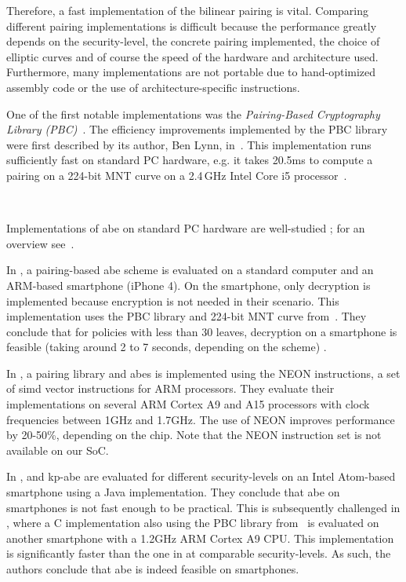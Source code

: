 Therefore, a fast implementation of the bilinear pairing is vital.
Comparing different pairing implementations is difficult because the performance greatly depends on the \gls{security-level}, the concrete pairing implemented, the choice of elliptic curves and of course the speed of the hardware and architecture used. 
Furthermore, many implementations are not portable due to hand-optimized assembly code or the use of architecture-specific instructions.

One of the first notable implementations was the \emph{Pairing-Based Cryptography Library (PBC)}~\cite{lynn_pairing-based_nodate, lynn_implementation_2007}.
The efficiency improvements implemented by the PBC library were first described by its author, Ben Lynn, in~\cite{lynn_implementation_2007}.
This implementation runs sufficiently fast on standard PC hardware, e.g. it takes 20.5ms to compute a pairing on a 224-bit MNT curve on a 2.4\,GHz Intel Core i5 processor~\cite{akinyele_self-protecting_2010}.

~

Implementations of \acrshort{abe} on standard PC hardware are well-studied \cite{bethencourt_ciphertext-policy_2007,akinyele_charm_2013,green_functional_nodate}; for an overview see~\cite{zickau_applied_2016}.

In \cite{akinyele_self-protecting_2010}, a pairing-based \acrshort{abe} scheme is evaluated on a standard computer and an ARM-based smartphone (iPhone 4).
On the smartphone, only decryption is implemented because encryption is not needed in their scenario.
This implementation uses the PBC library and 224-bit MNT curve from~\cite{lynn_implementation_2007}.
They conclude that for policies with less than 30 leaves, decryption on a smartphone is feasible (taking around 2 to 7 seconds, depending on the scheme) \cite{akinyele_self-protecting_2010}.

In \cite{sanchez_neon_2013}, a pairing library and \acrshort{abes} is implemented using the NEON instructions, a set of \acrshort{simd} vector instructions for ARM processors.
They evaluate their implementations on several ARM Cortex A9 and A15 processors with clock frequencies between 1GHz and 1.7GHz.
The use of NEON improves performance by 20-50\%, depending on the chip.
Note that the NEON instruction set is not available on our SoC. 

In \cite{wang_performance_2014},  and \acrshort{kp-abe} are evaluated for different \glspl{security-level} on an Intel Atom-based smartphone using a Java implementation.
They conclude that \acrshort{abe} on smartphones is not fast enough to be practical.
This is subsequently challenged in \cite{ambrosin_feasibility_2015}, where a C implementation also using the PBC library from~\cite{lynn_implementation_2007} is evaluated on another smartphone with a 1.2GHz ARM Cortex A9 CPU.
This implementation is significantly faster than the one in \cite{wang_performance_2014} at comparable \glspl{security-level}.
As such, the authors conclude that \acrshort{abe} is indeed feasible on smartphones.

